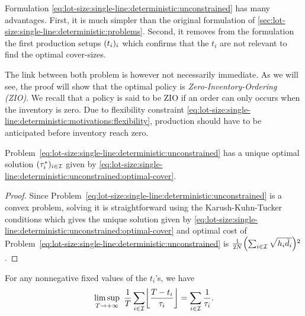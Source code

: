 Formulation \eqref{eq:lot-size:single-line:deterministic:unconstrained} has many advantages.
First, it is much simpler than the original formulation of \cref{sec:lot-size:single-line:deterministic:problems}.
Second, it removes from the formulation the first production setups $\bracket{t_i}_i$ which confirms that the $t_i$ are not relevant to find the optimal cover-sizes.


The link between both problem is however not necessarily immediate.
As we will see, the proof will show that the optimal policy is \emph{Zero-Inventory-Ordering (ZIO)}.
We recall that a policy is said to be ZIO if an order can only occurs when the inventory is zero.
Due to flexibility constraint \eqref{eq:lot-size:single-line:deterministic:motivations:flexibility}, production should have to be anticipated before inventory reach zero.



\begin{lem}\label{lem:lot-size:single-line:deterministic:unconstrained:optimality}
Problem~\eqref{eq:lot-size:single-line:deterministic:unconstrained} has a unique optimal solution $(\tau_i^*)_{i\in\mathcal{I}}$ given by \cref{eq:lot-size:single-line:deterministic:unconstrained:optimal-cover}.
\end{lem}


\begin{proof}
Since Problem~\eqref{eq:lot-size:single-line:deterministic:unconstrained} is a convex problem, solving it is straightforward using the Karush-Kuhn-Tucker conditions which gives the unique solution given by \cref{eq:lot-size:single-line:deterministic:unconstrained:optimal-cover} and optimal cost of Problem~\eqref{eq:lot-size:single-line:deterministic:unconstrained} is $\frac{1}{2\nbsetups}\bracket{\sum_{i\in\REF}\sqrt{\holding_i\tilde{\demand_i}}}^2$.
\end{proof}



\begin{lem}\label{lem:lot-size:deterministic:single-line:models:average-setup}
For any nonnegative fixed values of the $t_i$'s, we have
\begin{equation}
\limsup_{\horizon\rightarrow+\infty}\ \frac{1}{\horizon} \sum_{i\in\REF} \left\lfloor\frac{\horizon-t_i}{\cover_i}\right\rfloor
=
\sum_{i\in\REF} \frac{1}{\cover_i}.
\end{equation}
\end{lem}


